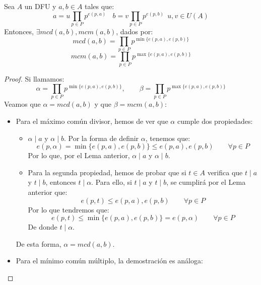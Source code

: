 \begin{prop}
    \label{propExistenMCDDFU}
    Sea $A$ un DFU y $a, b \in A$ tales que:
    $$a=u\prod_{p \in P} p^{e(p,a)}~~~~b=v\prod_{p\in P} p^{e(p,b)}~~u,v \in U(A)$$
    Entonces, $\exists mcd(a,b), mcm(a,b)$, dados por:
    $$mcd(a,b) = \prod_{p \in P} p^{\min\{e(p,a),e(p,b)\}}$$
    $$mcm(a,b) = \prod_{p \in P} p^{\max\{e(p,a),e(p,b)\}}$$
\begin{proof}
    Si llamamos:
    \begin{equation*}
        \alpha = \prod_{p \in P} p^{\min\{e(p,a),e(p,b)\}}, \qquad \beta = \prod_{p \in P} p^{\max\{e(p,a),e(p,b)\}}
    \end{equation*}
    Veamos que $\alpha = mcd(a,b)$  y que $\beta = mcm(a,b)$:
    \begin{itemize}
        \item Para el máximo común divisor, hemos de ver que $\alpha$ cumple dos propiedades:
            \begin{itemize}
                \item $\alpha \mid a$ y $\alpha \mid b$. Por la forma de definir $\alpha$, tenemos que:
                    \begin{equation*}
                        e(p,\alpha) = \min\{e(p,a),e(p,b)\} \leq e(p,a), e(p,b) \qquad \forall p\in P
                    \end{equation*}
                    Por lo que, por el Lema anterior, $\alpha \mid a $ y $\alpha \mid b$.
                \item Para la segunda propiedad, hemos de probar que si $t\in A$ verifica que $t\mid a$ y $t \mid b$, entonces $t\mid \alpha$. Para ello, si $t\mid a$ y $t\mid b$, se cumplirá por el Lema anterior que:
                    \begin{equation*}
                        e(p,t) \leq e(p,a), e(p,b) \qquad \forall p\in P
                    \end{equation*}
                    Por lo que tendremos que:
                    \begin{equation*}
                        e(p,t) \leq \min\{e(p,a), e(p,b)\} = e(p,\alpha) \qquad \forall p\in P
                    \end{equation*}
                    De donde $t \mid \alpha$.
            \end{itemize}
            De esta forma, $\alpha = mcd(a,b)$.
        \item Para el mínimo común múltiplo, la demostración es análoga:
            \begin{itemize}

\end{itemize}
\end{itemize}
\end{proof}
\end{prop}

